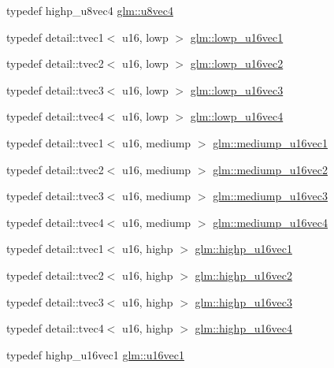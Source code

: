 \begin{DoxyCompactItemize}
typedef highp\+\_\+u8vec4 \hyperlink{group__gtc__type__precision_gaaf6b3d127698d893de8652deedfd3d9b}{glm\+::u8vec4}
\item 
typedef detail\+::tvec1$<$ u16, lowp $>$ \hyperlink{group__gtc__type__precision_ga25464b09e8e3c63f6896605e0c997eb1}{glm\+::lowp\+\_\+u16vec1}
\item 
typedef detail\+::tvec2$<$ u16, lowp $>$ \hyperlink{group__gtc__type__precision_gaff5ca5a8bc621bb8f4b28f046c0de508}{glm\+::lowp\+\_\+u16vec2}
\item 
typedef detail\+::tvec3$<$ u16, lowp $>$ \hyperlink{group__gtc__type__precision_ga74d5491c9ee66d068309d200601e907b}{glm\+::lowp\+\_\+u16vec3}
\item 
typedef detail\+::tvec4$<$ u16, lowp $>$ \hyperlink{group__gtc__type__precision_gab0210f390e7d75fa8eb42128a05ff23a}{glm\+::lowp\+\_\+u16vec4}
\item 
typedef detail\+::tvec1$<$ u16, mediump $>$ \hyperlink{group__gtc__type__precision_gacb35d25d662b2a6396d094197ca834f0}{glm\+::mediump\+\_\+u16vec1}
\item 
typedef detail\+::tvec2$<$ u16, mediump $>$ \hyperlink{group__gtc__type__precision_ga93fe5ddc21391f0334eb3a60b76c390b}{glm\+::mediump\+\_\+u16vec2}
\item 
typedef detail\+::tvec3$<$ u16, mediump $>$ \hyperlink{group__gtc__type__precision_ga82dbfd263ced8d03577008a3ef096598}{glm\+::mediump\+\_\+u16vec3}
\item 
typedef detail\+::tvec4$<$ u16, mediump $>$ \hyperlink{group__gtc__type__precision_gaad8b540f4231f69823c39fe9dfcb945a}{glm\+::mediump\+\_\+u16vec4}
\item 
typedef detail\+::tvec1$<$ u16, highp $>$ \hyperlink{group__gtc__type__precision_gac4a83dec879b77ab0055c8da232da066}{glm\+::highp\+\_\+u16vec1}
\item 
typedef detail\+::tvec2$<$ u16, highp $>$ \hyperlink{group__gtc__type__precision_gafad4245d389a4990eb505cd74a2d0a6f}{glm\+::highp\+\_\+u16vec2}
\item 
typedef detail\+::tvec3$<$ u16, highp $>$ \hyperlink{group__gtc__type__precision_gad98b30ad9bbfb79233340be3ba53ceb6}{glm\+::highp\+\_\+u16vec3}
\item 
typedef detail\+::tvec4$<$ u16, highp $>$ \hyperlink{group__gtc__type__precision_ga89074b108ec0643cffdfd008bedd3ffb}{glm\+::highp\+\_\+u16vec4}
\item 
typedef highp\+\_\+u16vec1 \hyperlink{group__gtc__type__precision_ga95324b9d781c51a6d31b05fcc63c5cbe}{glm\+::u16vec1}
\item 

\end{DoxyCompactItemize}
